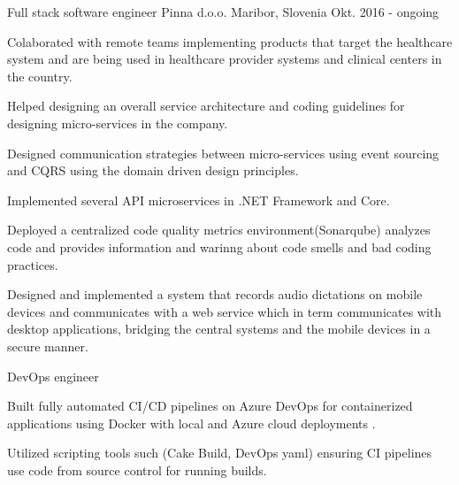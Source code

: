 

\begin{cventries}

  \cventry
    {Full stack software engineer} %
    {Pinna d.o.o.} %
    {Maribor, Slovenia} %
    {Okt. 2016 - ongoing} %
    {
      \begin{cvitems} %
        \item {Colaborated with remote teams implementing products that target the healthcare system and are being used in healthcare provider systems and clinical centers in the country.}
        \item {Helped designing an overall service architecture and coding guidelines for designing micro-services in the company.}
        \item {Designed communication strategies between micro-services using event sourcing and CQRS using the domain driven design principles.}
        \item {Implemented several API microservices in .NET Framework and Core.}
        \item {Deployed a centralized code quality metrics environment(Sonarqube) analyzes code and provides information and warinng about code smells and bad coding practices.}
        \item {Designed and implemented a system that records audio dictations on mobile devices and communicates with a web service which in term communicates with desktop applications, bridging the central systems and the mobile devices in a secure manner.}
      \end{cvitems}
    }
    \cventry
    {DevOps engineer} %
    {} %
    {} %
    {} %
    {
      \begin{cvitems} %
        \item {Built fully automated CI/CD pipelines on Azure DevOps for containerized applications using Docker with local and Azure cloud deployments .}
        \item {Utilized scripting tools such (Cake Build, DevOps yaml) ensuring CI pipelines use code from source control for running builds.\\}

\end{cvitems}}
\end{cventries}
